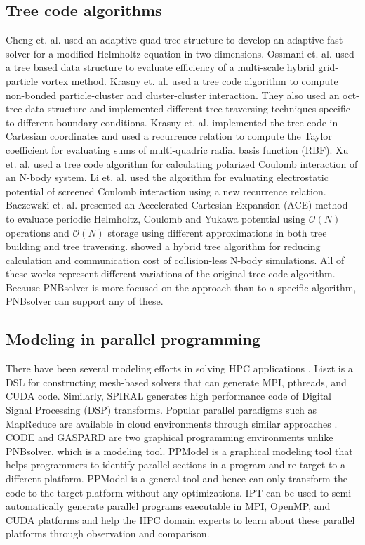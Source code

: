 \documentclass[draftclsnofoot]{elsarticle}
\begin{document}
\subsection{Tree code algorithms}
Cheng et. al. \cite{cheng} used an adaptive quad tree structure to develop an adaptive fast solver for a modified Helmholtz equation in
two dimensions. Ossmani et. al. \cite{ossmani} used a tree based data structure to evaluate efficiency of a multi-scale hybrid 
grid-particle vortex method. Krasny et. al.  \cite{krasny1} used a tree code algorithm to compute non-bonded particle-cluster and 
cluster-cluster interaction. They also used an oct-tree data structure and implemented different tree traversing techniques specific to different 
boundary conditions. Krasny et. al. \cite{krasny2} implemented the tree code in Cartesian coordinates and used a recurrence relation 
to compute the Taylor coefficient for evaluating sums of multi-quadric radial basis function (RBF). Xu et. al. \cite{xu} used a tree code 
algorithm for calculating polarized Coulomb interaction of an N-body system. Li et. al. \cite{li} used the algorithm
for evaluating electrostatic potential of screened Coulomb interaction using a new recurrence relation. 
Baczewski et. al. \cite{baczewski} presented an Accelerated Cartesian Expansion (ACE) method to evaluate periodic 
Helmholtz, Coulomb and Yukawa potential using $\mathcal{O}(N)$ operations and $\mathcal{O}(N)$ storage using different approximations in
both tree building and tree traversing.  \cite{hybridtree2015} showed a hybrid tree algorithm for reducing calculation and communication cost of 
collision-less N-body simulations.
All of these works represent different variations of the original tree code algorithm.
Because PNBsolver is more focused on the approach than to a specific algorithm, PNBsolver can support any of these. 

\subsection{Modeling in parallel programming}
There have been several modeling efforts in solving HPC applications \cite{rithu1,rithu2}. Liszt \cite{liszt} is a DSL for constructing mesh-based solvers that 
can generate MPI, pthreads, and CUDA code. Similarly, SPIRAL \cite{spiral} generates high performance code of Digital Signal Processing (DSP) transforms. 
Popular parallel paradigms such as MapReduce are available in cloud environments through similar approaches \cite{mapredoop}.
CODE \cite{code} and GASPARD \cite{gaspard} are two graphical programming environments unlike PNBsolver, which is a modeling tool. 
PPModel \cite{sc11,acmse} is a graphical modeling tool that helps programmers to identify parallel sections in a program and re-target to a different 
platform.  PPModel is a general tool and hence can only transform the code to the target platform without any optimizations.
IPT \cite{ipt} can be used to semi-automatically generate parallel programs executable in MPI, OpenMP, and CUDA platforms and help the HPC domain experts to learn about 
these parallel platforms through observation and comparison.
\end{document}
